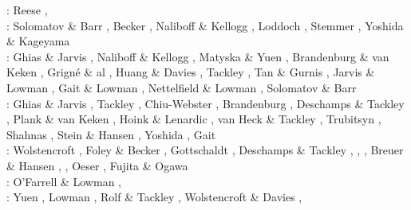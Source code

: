 \begin{scriptsize}
\twothousandfive: Reese \etal \cite{resb05}, \cite{taxn05}
                  \cite{bupc05}\cite{grlt05}
                  \cite{lemj05}\cite{kogk05}
                  \cite{mczh05b}\cite{vary05}
                  \cite{nata05}\cite{nabu05}
                  \cite{chob05}\cite{phbu05}
                  \cite{hosh05}\\
\twothousandsix: Solomatov \& Barr \cite{soba06}, Becker \cite{beck06}, Naliboff \& Kellogg \cite{nake06},
                 Loddoch \etal \cite{losh06}, Stemmer \etal \cite{sthh06}, Yoshida \& Kageyama \cite{yoka06}\\
\twothousandseven: Ghias \& Jarvis \cite{ghja07}, Naliboff \& Kellogg \cite{nake07}, 
                   Matyska \& Yuen \cite{mayu07}, Brandenburg \& van Keken \cite{brva07a,brva07b},
                   Grign\'e \& al \cite{grlt07,grlt07b}, Huang \& Davies \cite{huda07},
                   Tackley \etal \cite{tanh07}, Tan \& Gurnis \cite{tagu07}, 
                   Jarvis \& Lowman \cite{jalo07}, Gait \& Lowman \cite{galo07,galo07b}, 
                   Nettelfield \& Lowman \cite{nelo07}, Solomatov \& Barr \cite{soba07}\\
\twothousandeight: Ghias \& Jarvis \cite{ghja08}, Tackley \cite{tack08,tack08b},
                   Chiu-Webster \etal \cite{chhl08}, Brandenburg \etal \cite{brhv08},
                   Deschamps \& Tackley \cite{deta08}, Plank \& van Keken \cite{plva08},
                   Hoink \& Lenardic \cite{hole08}, van Heck \& Tackley \cite{vata08},
                   Trubitsyn \etal \cite{trkr08}, Shahnas \etal \cite{shlj08},
                   Stein \& Hansen \cite{stha08}, Yoshida \cite{yosh08}, Gait \etal \cite{galg08}\\
\twothousandnine: Wolstencroft \etal \cite{wodd09}, Foley \& Becker \cite{fobe09},
                  Gottschaldt \etal \cite{gows09}, Deschamps \& Tackley \cite{deta09},
                  \cite{onlj09}\cite{wazh09},
                  \cite{vavv09}, Breuer \& Hansen \cite{brha09},
                  \cite{scbs09b}, Oeser \etal \cite{oebm09},
                  Fujita \& Ogawa \cite{fuog09}\\
\twothousandten: O'Farrell \& Lowman \cite{oflo10}, \cite{bumb10}
                 \cite{detn10}\cite{yayh10}
                 \cite{nata10}\cite{hole10}
                 \cite{zhzl10}\cite{vayb10}
                 \cite{brmw10}\\
\twothousandeleven: Yuen \etal \cite{yutc11}, Lowman \cite{lowm11},
                    Rolf \& Tackley \cite{rota11}, Wolstencroft \& Davies \cite{woda11},

\end{scriptsize}
